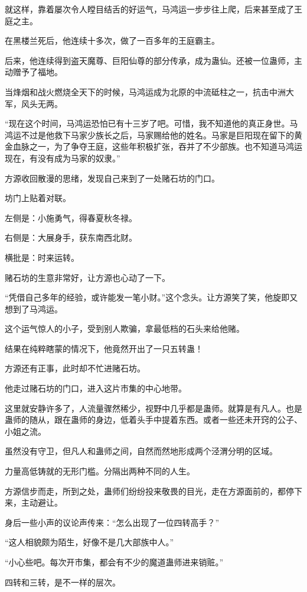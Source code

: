 \begin{this_body}
就这样，靠着屡次令人瞠目结舌的好运气，马鸿运一步步往上爬，后来甚至成了王庭之主。

在黑楼兰死后，他连续十多次，做了一百多年的王庭霸主。

后来，他连续得到盗天魔尊、巨阳仙尊的部分传承，成为蛊仙。还被一位蛊师，主动赠予了福地。

当烽烟和战火燃烧全天下的时候，马鸿运成为北原的中流砥柱之一，抗击中洲大军，风头无两。

“现在这个时间，马鸿运恐怕已有十三岁了吧。可惜，我不知道他的真正身世。马鸿运不过是他救下马家少族长之后，马家赐给他的姓名。马家是巨阳现在留下的黄金血脉之一，为了争夺王庭，这些年积极扩张，吞并了不少部族。也不知道马鸿运现在，有没有成为马家的奴隶。”

方源收回散漫的思绪，发现自己来到了一处赌石坊的门口。

坊门上贴着对联。

左侧是：小施勇气，得春夏秋冬禄。

右侧是：大展身手，获东南西北财。

横批是：时来运转。

赌石坊的生意非常好，让方源也心动了一下。

“凭借自己多年的经验，或许能发一笔小财。”这个念头。让方源笑了笑，他旋即又想到了马鸿运。

这个运气惊人的小子，受到别人欺骗，拿最低档的石头来给他赌。

结果在纯粹瞎蒙的情况下，他竟然开出了一只五转蛊！

方源还有正事，此时却不忙进赌石坊。

他走过赌石坊的门口，进入这片市集的中心地带。

这里就安静许多了，人流量骤然稀少，视野中几乎都是蛊师。就算是有凡人。也是蛊师的随从，跟在蛊师的身边，低着头手中提着东西。或者一些还未开窍的公子、小姐之流。

虽然没有守卫，但凡人和蛊师之间，自然而然地形成两个泾渭分明的区域。

力量高低铸就的无形门槛。分隔出两种不同的人生。

方源信步而走，所到之处，蛊师们纷纷投来敬畏的目光，走在方源面前的，都停下来，主动避让。

身后一些小声的议论声传来：“怎么出现了一位四转高手？”

“这人相貌颇为陌生，好像不是几大部族中人。”

“小心些吧。每次开市集，都会有不少的魔道蛊师进来销赃。”

四转和三转，是不一样的层次。


\end{this_body}

